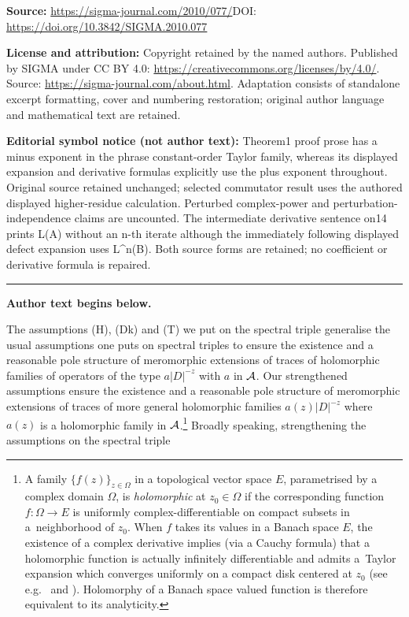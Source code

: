 \documentclass[11pt]{article}
\numberwithin{equation}{section}
\begin{document}
\noindent\textbf{Source:} \url{https://sigma-journal.com/2010/077/}\quad DOI: \url{https://doi.org/10.3842/SIGMA.2010.077}\par
\noindent\textbf{License and attribution:} Copyright retained by the named authors. Published by SIGMA under CC BY 4.0: \url{https://creativecommons.org/licenses/by/4.0/}. Source: \url{https://sigma-journal.com/about.html}. Adaptation consists of standalone excerpt formatting, cover and numbering restoration; original author language and mathematical text are retained.\par
\noindent\textbf{Editorial symbol notice (not author text):} Theorem1 proof prose has a minus exponent in the phrase constant-order Taylor family, whereas its displayed expansion and derivative formulas explicitly use the plus exponent throughout. Original source retained unchanged; selected commutator result uses the authored displayed higher-residue calculation. Perturbed complex-power and perturbation-independence claims are uncounted. The intermediate derivative sentence on14 prints L(A) without an n-th iterate although the immediately following displayed defect expansion uses L\textasciicircum{}n(B). Both source forms are retained; no coefficient or derivative formula is repaired.\par
\medskip\hrule\medskip\noindent\textbf{Author text begins below.}\par
\setcounter{section}{1}
\setcounter{subsection}{0}
\setcounter{subsubsection}{0}
\setcounter{equation}{0}
\setcounter{footnote}{0}
 The assumptions (H), (Dk) and (T) we put on the spectral triple generalise
the usual assumptions one puts on spectral triples to ensure the existence and a
reasonable pole structure of
meromorphic extensions of traces of holomorphic families of  operators of the
type $a \vert
D\vert^{-z}$ with $a$ in ${\cal A}$. Our strengthened assumptions ensure
the existence and a reasonable pole structure of meromorphic extensions of  traces of  more general holomorphic families
$a(z)   \vert D\vert^{-z}$ where $a(z)$ is a holomorphic family in ${\cal
  A}$.\footnote{\label{footnote:holfam}A family $\{f(z)\}_{z\in \Omega}$  in a topological vector space $E$,
 parametrised by a complex domain $\Omega$,  is {\it  holomorphic} at
$z_0\in \Omega$ if
the corresponding function $f:\Omega\to E$  is   uniformly
complex-dif\/ferentiable on compact subsets in a~neighborhood of $z_0$.  When $f$
takes its values in a Banach space $E$,    the existence of a complex
derivative  implies (via  a  Cauchy formula) that a holomorphic
function is actually inf\/initely dif\/ferentiable and admits a~Taylor expansion which converges uniformly  on a  compact disk centered at
  $z_0$ (see e.g.~\cite[Theorem~8.1.7]{Hig}   and \cite[Section~XV.5.1]{DS}).
   Holomorphy of a Banach space valued function is therefore equivalent to
   its analyticity.}  Broadly speaking, strengthening the assumptions on the spectral triple
\end{document}

